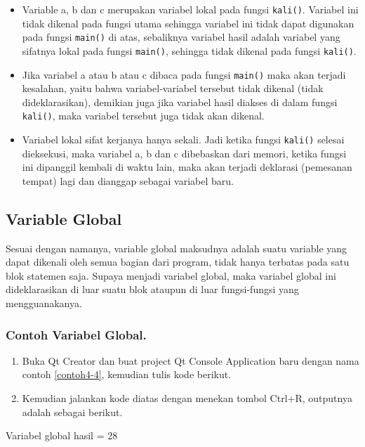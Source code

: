 \begin{itemize}

\item
 Variable a, b dan c merupakan variabel lokal pada fungsi
 \texttt{kali()}. Variabel ini tidak dikenal pada fungsi utama sehingga
 variabel ini tidak dapat digunakan pada fungsi \texttt{main()} di
 atas, sebaliknya variabel hasil adalah variabel yang sifatnya lokal
 pada fungsi \texttt{main()}, sehingga tidak dikenal pada fungsi
 \texttt{kali()}.\\
\item
 Jika variabel a atau b atau c dibaca pada fungsi \texttt{main()} maka
 akan terjadi kesalahan, yaitu bahwa variabel-variabel tersebut tidak
 dikenal (tidak dideklarasikan), demikian juga jika variabel hasil
 diakses di dalam fungsi \texttt{kali()}, maka variabel tersebut juga
 tidak akan dikenal.\\
\item
 Variabel lokal sifat kerjanya hanya sekali. Jadi ketika fungsi
 \texttt{kali()} selesai dieksekusi, maka variabel a, b dan c
 dibebaskan dari memori, ketika fungsi ini dipanggil kembali di waktu
 lain, maka akan terjadi deklarasi (pemesanan tempat) lagi dan dianggap
 sebagai variabel baru.
\end{itemize}

\subsection{Variable Global}\label{variable-global}

Sesuai dengan namanya, variable global maksudnya adalah suatu variable
yang dapat dikenali oleh semua bagian dari program, tidak hanya terbatas
pada satu blok statemen saja. Supaya menjadi variabel global, maka
variabel global ini dideklarasikan di luar suatu blok ataupun di luar
fungsi-fungsi yang mengguanakanya.

\subsubsection*{Contoh Variabel Global.}

\begin{enumerate}

\item
 Buka Qt Creator dan buat project Qt Console Application baru dengan
 nama contoh \ref{contoh4-4}, kemudian tulis kode berikut.




\item
 Kemudian jalankan kode diatas dengan menekan tombol Ctrl+R, outputnya
 adalah sebagai berikut.
\end{enumerate}
\begin{lcverbatim}
Variabel global hasil = 28
\end{lcverbatim}


